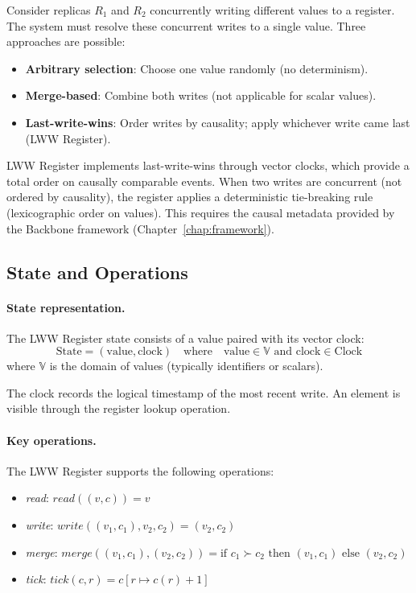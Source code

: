 Consider replicas $R_1$ and $R_2$ concurrently writing different values to a register. The system must resolve these concurrent writes to a single value. Three approaches are possible:

\begin{itemize}
  \item \textbf{Arbitrary selection}: Choose one value randomly (no determinism).
  \item \textbf{Merge-based}: Combine both writes (not applicable for scalar values).
  \item \textbf{Last-write-wins}: Order writes by causality; apply whichever write came last (LWW Register).
\end{itemize}

LWW Register implements last-write-wins through vector clocks, which provide a total order on causally comparable events. When two writes are concurrent (not ordered by causality), the register applies a deterministic tie-breaking rule (lexicographic order on values). This requires the causal metadata provided by the Backbone framework (Chapter~\ref{chap:framework}).

\subsection{State and Operations}

\paragraph{State representation.} The LWW Register state consists of a value paired with its vector clock:
\[
\text{State} = (\text{value}, \text{clock}) \quad \text{where} \quad \text{value} \in \mathbb{V} \text{ and } \text{clock} \in \text{Clock}
\]
where $\mathbb{V}$ is the domain of values (typically identifiers or scalars).

The clock records the logical timestamp of the most recent write. An element is visible through the register lookup operation.

\paragraph{Key operations.} The LWW Register supports the following operations:
\begin{itemize}
  \item \textit{read}: $\mathit{read}((v, c)) = v$
  \item \textit{write}: $\mathit{write}((v_1, c_1), v_2, c_2) = (v_2, c_2)$
  \item \textit{merge}: $\mathit{merge}((v_1, c_1), (v_2, c_2)) = \text{if } c_1 \succ c_2 \text{ then } (v_1, c_1) \text{ else } (v_2, c_2)$
  \item \textit{tick}: $\mathit{tick}(c, r) = c[r \mapsto c(r)+1]$
\end{itemize}


